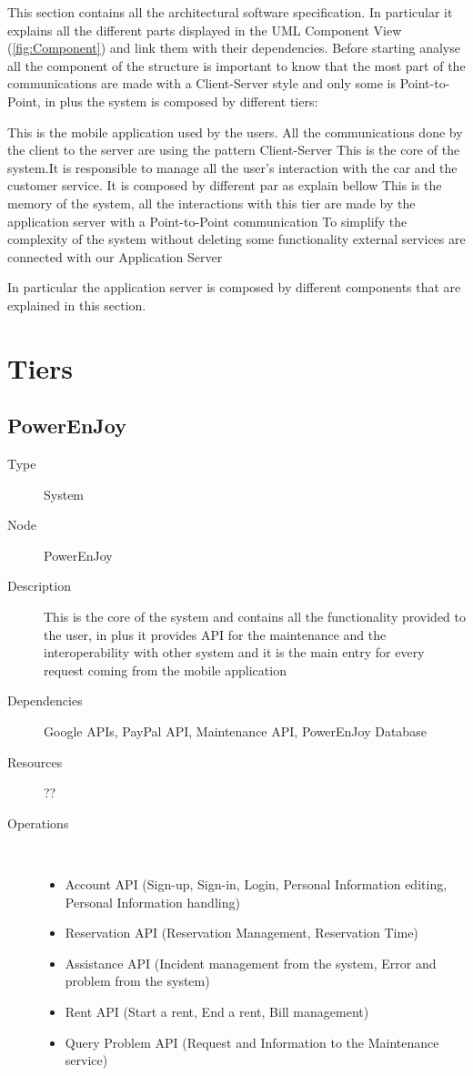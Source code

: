 This section contains all the architectural software specification. In particular it explains all the different parts displayed in the UML Component View (\ref{fig:Component}) and link them with their dependencies. Before starting analyse all the component of the structure is important to know that the most part of the communications are made with a Client-Server style and only some is Point-to-Point, in plus the system is composed by different tiers:
\begin{itemize}
	 This is the mobile application used by the users. All the communications done by the client to the server are using the pattern Client-Server
	 This is the core of the system.It is responsible to manage all the user's interaction with the car and the customer service. It is composed by different par as explain bellow
	 This is the memory of the system, all the interactions with this tier are made by the application server with a Point-to-Point communication
	 To simplify the complexity of the system without deleting some functionality external services are connected with our Application Server
\end{itemize}
In particular the application server is composed by different components that are explained in this section.

\section{Tiers}
\subsection{PowerEnJoy}
\begin{description}
	\item[Type] System
	\item[Node] PowerEnJoy
	\item[Description] This is the core of the system and contains all the functionality provided to the user, in plus it provides API for the maintenance and the interoperability with other system and it is the main entry for every request coming from the mobile application
	\item[Dependencies] Google APIs, PayPal API, Maintenance API, PowerEnJoy Database
	\item[Resources] ??
	\item[Operations] \ \\
		\begin{itemize}
			\item Account API (Sign-up, Sign-in, Login, Personal Information editing, Personal Information handling)
			\item Reservation API (Reservation Management, Reservation Time)
			\item Assistance API (Incident management from the system, Error and problem from the system)
			\item Rent API (Start a rent, End a rent, Bill management)
			\item Query Problem API (Request and Information to the Maintenance service)
		\end{itemize}
\end{description}

